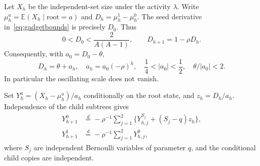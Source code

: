 \documentclass[11pt]{article}
\newcommand{\E}{\mathbb E}
\begin{document}
Let $X_h$ be the independent-set size under the activity $\lambda$.
Write $\mu_h^a=\E(X_h\mid\text{root}=a)$ and
$D_h=\mu_h^1-\mu_h^0$. The seed derivative in~\eqref{eq:gadgetbounds}
is precisely $D_0$. Thus
\[
 0<D_0<\frac{2}{A(A-1)},\qquad
 D_{h+1}=1-\rho D_h.
\]
Consequently, with $a_0=D_0-\theta$,
\begin{equation}\label{eq:gap}
 D_h=\theta+a_h,\quad a_h=a_0(-\rho)^h,\quad
 \frac14<|a_0|<\frac12,\quad \theta/|a_0|<2.
\end{equation}
In particular the oscillating scale does not vanish.

Set $Y_h^a=(X_h-\mu_h^a)/a_h$ conditionally on the root state, and
$z_h=D_h/a_h$. Independence of the child subtrees gives
\begin{equation}\label{eq:smoothing}
 \begin{split}
 Y_{h+1}^0&\overset d=-\rho^{-1}\sum_{j=1}^{2}
       \{Y_{h,j}^{S_j}+(S_j-q)z_h\},\\
 Y_{h+1}^1&\overset d=-\rho^{-1}\sum_{j=1}^{2}Y_{h,j}^0,
 \end{split}
\end{equation}
where $S_j$ are independent Bernoulli variables of parameter $q$,
and the conditional child copies are independent.
\end{document}
